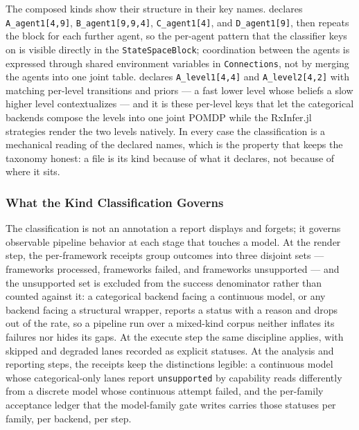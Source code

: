 \documentclass[
  english,
  9pt,
]{extarticle}
\begin{document}
The composed kinds show their structure in their key names.
 declares
\texttt{A\_agent1{[}4,9{]}}, \texttt{B\_agent1{[}9,9,4{]}},
\texttt{C\_agent1{[}4{]}}, and \texttt{D\_agent1{[}9{]}}, then repeats
the block for each further agent, so the per-agent pattern that the
classifier keys on is visible directly in the \texttt{StateSpaceBlock};
coordination between the agents is expressed through shared environment
variables in \texttt{Connections}, not by merging the agents into one
joint table.
 declares
\texttt{A\_level1{[}4,4{]}} and \texttt{A\_level2{[}4,2{]}} with
matching per-level transitions and priors --- a fast lower level whose
beliefs a slow higher level contextualizes --- and it is these per-level
keys that let the categorical backends compose the levels into one joint
POMDP while the RxInfer.jl strategies render the two levels natively. In
every case the classification is a mechanical reading of the declared
names, which is the property that keeps the taxonomy honest: a file is
its kind because of what it declares, not because of where it sits.

\subsubsection{What the Kind Classification
Governs}\label{what-the-kind-classification-governs}

The classification is not an annotation a report displays and forgets;
it governs observable pipeline behavior at each stage that touches a
model. At the render step, the per-framework receipts group outcomes
into three disjoint sets --- frameworks processed, frameworks failed,
and frameworks unsupported --- and the unsupported set is excluded from
the success denominator rather than counted against it: a categorical
backend facing a continuous model, or any backend facing a structural
wrapper, reports a status with a reason and drops out of the rate, so a
pipeline run over a mixed-kind corpus neither inflates its failures nor
hides its gaps. At the execute step the same discipline applies, with
skipped and degraded lanes recorded as explicit statuses. At the
analysis and reporting steps, the receipts keep the distinctions
legible: a continuous model whose categorical-only lanes report
\texttt{unsupported} by capability reads differently from a discrete
model whose continuous attempt failed, and the per-family acceptance
ledger that the model-family gate writes carries those statuses per
family, per backend, per step.
\end{document}
